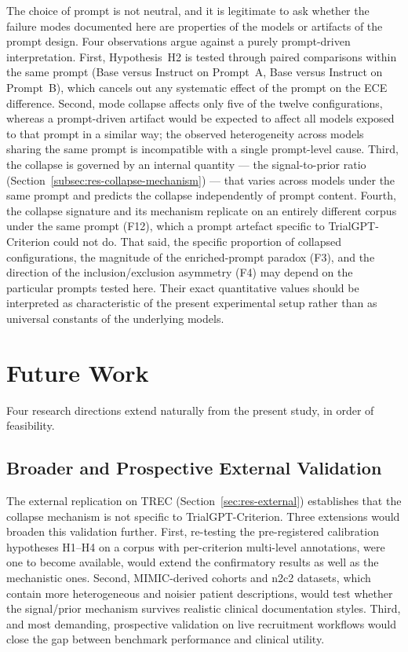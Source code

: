 The choice of prompt is not neutral, and it is legitimate to ask 
whether the failure modes documented here are properties of the 
models or artifacts of the prompt design. Four observations argue 
against a purely prompt-driven interpretation. First, Hypothesis~H2 
is tested through paired comparisons within the same prompt (Base 
versus Instruct on Prompt~A, Base versus Instruct on Prompt~B), 
which cancels out any systematic effect of the prompt on the ECE 
difference. Second, mode collapse affects only five of the twelve 
configurations, whereas a prompt-driven artifact would be expected to 
affect all models exposed to that prompt in a similar way; the 
observed heterogeneity across models sharing the same prompt is 
incompatible with a single prompt-level cause. Third, the collapse is 
governed by an internal quantity --- the signal-to-prior ratio 
(Section~\ref{subsec:res-collapse-mechanism}) --- that varies across 
models under the same prompt and predicts the collapse independently of 
prompt content. Fourth, the collapse signature and its mechanism 
replicate on an entirely different corpus under the same prompt (F12), 
which a prompt artefact specific to TrialGPT-Criterion could not do. 
That said, the specific proportion of collapsed configurations, the 
magnitude of the enriched-prompt paradox (F3), and the direction of the 
inclusion/exclusion asymmetry (F4) may depend on the particular prompts 
tested here. Their exact quantitative values should be interpreted as 
characteristic of the present experimental setup rather than as 
universal constants of the underlying models.

\section{Future Work}
\label{sec:conc-future}

Four research directions extend naturally from the present study, in 
order of feasibility.

\subsection{Broader and Prospective External Validation}
\label{subsec:conc-external}

The external replication on TREC (Section~\ref{sec:res-external}) 
establishes that the collapse mechanism is not specific to 
TrialGPT-Criterion. Three extensions would broaden this validation 
further. First, re-testing the pre-registered calibration hypotheses 
H1--H4 on a corpus with per-criterion multi-level annotations, were one 
to become available, would extend the confirmatory results as well as 
the mechanistic ones. Second, MIMIC-derived cohorts and n2c2 datasets, 
which contain more heterogeneous and noisier patient descriptions, would 
test whether the signal/prior mechanism survives realistic clinical 
documentation styles. Third, and most demanding, prospective validation 
on live recruitment workflows would close the gap between benchmark 
performance and clinical utility.

